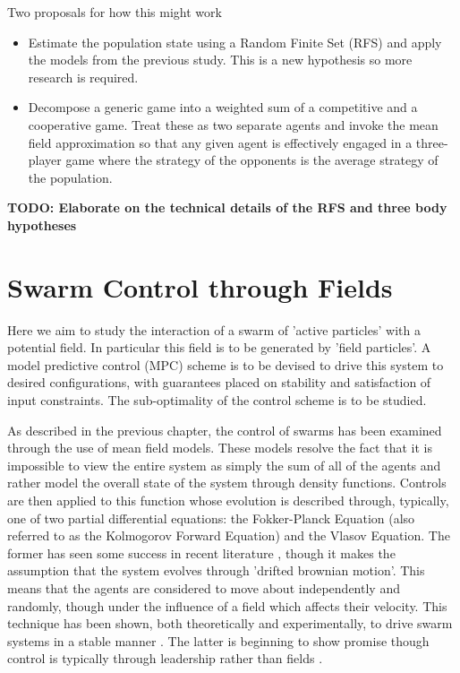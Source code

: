 \documentclass[.../main.tex]{subfiles}
\begin{document}
	Two proposals for how this might work

	\begin{itemize}
		\item Estimate the population state using a Random Finite Set (RFS) and apply the models
		from the previous study. This is a new hypothesis so more research is required.
		\item Decompose a generic game into a weighted sum of a competitive and a cooperative game.
		Treat these as two separate agents and invoke the mean field approximation so that any given
		agent is effectively engaged in a three-player game where the strategy of the opponents is
		the average strategy of the population.
	\end{itemize}

	
	\textbf{TODO: Elaborate on the technical details of the RFS and three body hypotheses}


    \section{Swarm Control through Fields} \label{sec::Swarm_Field_Control}

    Here we aim to study the interaction of a swarm of 'active particles' with a potential field. In
    particular this field is to be generated by 'field particles'. A model predictive control 
    (MPC) scheme
    is to be devised to drive this system to desired configurations, with guarantees placed on
    stability and satisfaction of input constraints. The sub-optimality of the control
    scheme is to be studied.

    As described in the previous chapter, the control of swarms has been examined through the use of
    mean field models. These models resolve the fact that it is impossible to view the entire system
    as simply the sum of all of the agents and rather model the overall state of the system through
    density functions. Controls are then applied to this function whose evolution is described
    through, typically, one of two partial differential equations: the Fokker-Planck Equation (also
    referred to as the Kolmogorov Forward Equation) and the Vlasov Equation. The former has seen
    some success in recent literature \cite{Zhang2018, Elamvazhuthi2019, Li2017,
    BorziCollectiveMotion}, though it makes the assumption that the system evolves through 'drifted
    brownian motion'. This means that the agents are considered to move about independently and
    randomly, though under the influence of a field which affects their velocity. This technique
	has been shown, both theoretically and experimentally, to drive swarm systems in a stable
	manner \cite{Any paper of Fokker Planck control}. The latter is beginning to show promise 
	though control is typically through leadership rather than fields \cite{VlasovMPC}. 
\end{document}
